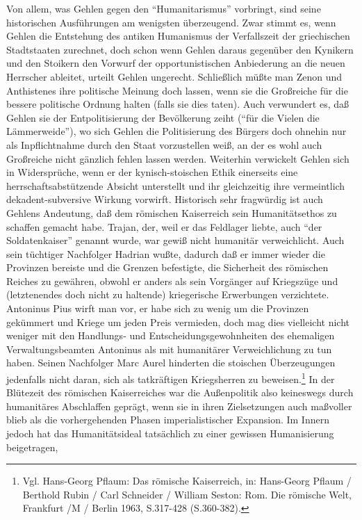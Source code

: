 \documentclass[12pt,a4paper]{article}
\begin{document}
Von allem, was Gehlen gegen den "`Humanitarismus"' vorbringt, sind seine
historischen Ausführungen am wenigsten überzeugend. Zwar stimmt es, wenn
Gehlen die Entstehung des antiken Humanismus der Verfallszeit der griechischen
Stadtstaaten zurechnet, doch schon wenn Gehlen daraus gegenüber den Kynikern
und den Stoikern den Vorwurf der opportunistischen Anbiederung an die neuen
Herrscher ableitet, urteilt Gehlen ungerecht. Schließlich müßte man Zenon und
Anthistenes ihre politische Meinung doch lassen, wenn sie die Großreiche für
die bessere politische Ordnung halten (falls sie dies taten). Auch verwundert
es, daß Gehlen sie der Entpolitisierung der Bevölkerung zeiht ("`für die
Vielen die Lämmerweide"'), wo sich Gehlen die Politisierung des Bürgers doch
ohnehin nur als Inpflichtnahme durch den Staat vorzustellen weiß, an der es
wohl auch Großreiche nicht gänzlich fehlen lassen werden. Weiterhin verwickelt
Gehlen sich in Widersprüche, wenn er der kynisch-stoischen Ethik einerseits
eine herrschaftsabstützende Absicht unterstellt und ihr gleichzeitig ihre
vermeintlich dekadent-subversive Wirkung vorwirft.  Historisch sehr fragwürdig
ist auch Gehlens Andeutung, daß dem römischen Kaiserreich sein Humanitätsethos
zu schaffen gemacht habe. Trajan, der, weil er das Feldlager liebte, auch
"`der Soldatenkaiser"' genannt wurde, war gewiß nicht humanitär verweichlicht.
Auch sein tüchtiger Nachfolger Hadrian wußte, dadurch daß er immer wieder die
Provinzen bereiste und die Grenzen befestigte, die Sicherheit des römischen
Reiches zu gewähren, obwohl er anders als sein Vorgänger auf Kriegszüge und
(letztenendes doch nicht zu haltende) kriegerische Erwerbungen verzichtete.
Antoninus Pius wirft man vor, er habe sich zu wenig um die Provinzen gekümmert
und Kriege um jeden Preis vermieden, doch mag dies vielleicht nicht weniger
mit den Handlungs- und Entscheidungsgewohnheiten des ehemaligen
Verwaltungsbeamten Antoninus als mit humanitärer Verweichlichung zu tun haben.
Seinen Nachfolger Marc Aurel hinderten die stoischen Überzeugungen jedenfalls
nicht daran, sich als tatkräftigen Kriegsherren zu beweisen.\footnote{Vgl.
  Hans-Georg Pflaum: Das römische Kaiserreich, in: Hans-Georg Pflaum /
  Berthold Rubin / Carl Schneider / William Seston: Rom. Die römische Welt,
  Frankfurt /M / Berlin 1963, S.317-428 (S.360-382).} In der Blütezeit des
römischen Kaiserreiches war die Außenpolitik also keineswegs durch humanitäres
Abschlaffen geprägt, wenn sie in ihren Zielsetzungen auch maßvoller blieb als
die vorhergehenden Phasen imperialistischer Expansion. Im Innern jedoch hat
das Humanitätsideal tatsächlich zu einer gewissen Humanisierung beigetragen,
\end{document}
